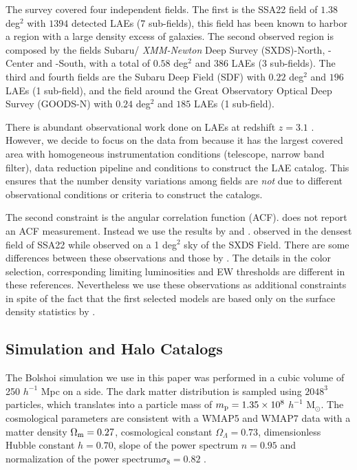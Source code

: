 \documentclass[usenatbib]{mn2e}
\begin{document}
The survey covered four independent fields. The first is the SSA22
field of $1.38$ deg$^2$ with $1394$ detected LAEs (7 sub-fields), this
field has been known to harbor a region with a large density excess of
galaxies. The second observed region is composed by the fields Subaru/{\it
  XMM-Newton} Deep Survey (SXDS)-North, -Center and -South, with a
total of $0.58$ deg$^2$ and $386$ LAEs (3 sub-fields). The third and
fourth fields are the Subaru Deep Field (SDF) with $0.22$ deg$^2$ and
$196$ LAEs (1 sub-field), and the field around the Great Observatory
Optical Deep Survey  (GOODS-N) with $0.24$ deg$^2$ and $185$ LAEs (1
sub-field).  

There is abundant observational work done on LAEs at redshift $z=3.1$
\citep{Kudritzki2000,Matsuda2005,Gawiser2007,Nilsson2007,Ouchi2008}.
However, we decide to focus on the data from \cite{Yamada2012} because
it has the largest covered area with homogeneous instrumentation
conditions (telescope, narrow band filter), data reduction pipeline
and conditions to construct the LAE catalog. This ensures that the
number density variations among fields are \emph{not} due to different
observational conditions or criteria to construct the catalogs.

The second constraint is the angular correlation function
(ACF). \cite{Yamada2012} does not report an ACF measurement. Instead
we use the results by \cite{Hayashino2004} and
\cite{Ouchi2008,Ouchi2010}. \cite{Hayashino2004} observed in the
densest field of SSA22 while \cite{Ouchi2008} observed on a 1 deg$^2$
sky of the SXDS Field.  There are some differences between these
observations and those by \cite{Yamada2012}. The details in the color
selection, corresponding limiting luminosities and EW thresholds are
different in these references. Nevertheless we use these observations
as additional constraints in spite of the fact that the first selected
models are based only on the surface density statistics by
\citep{Yamada2012}.  


\subsection{Simulation and Halo Catalogs}

The Bolshoi simulation \citep{Bolshoi} we use in this paper was
performed in a cubic volume of 250 $h^{-1}$ Mpc on a side. The
dark matter distribution is sampled using $2048^{3}$ particles, which
translates into a particle mass of $m_{\rm   p}=1.35\times 10^{8}$
$h^{-1}$ M$_{\odot}$.  The cosmological parameters are consistent with
a WMAP5 and WMAP7 data with a matter density $\Omega_{\rm m} = 0.27$,
cosmological constant $\Omega_{\Lambda}=0.73$, dimensionless Hubble constant
$h=0.70$, slope of the power spectrum $n=0.95$ and normalization of the
power spectrum$\sigma_{8}=0.82$ \citep{Komatsu2009,Jarosik2011}.  
\end{document}
